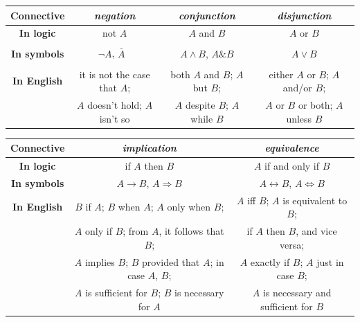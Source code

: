 \documentclass[12pt,notitlepage]{article}
\theoremstyle{plain}
\theoremstyle{definition}
\theoremstyle{plain}
\newcommand{\1}{\mathbf{1}}
\newcommand{\0}{\mathbf{0}}
\newcommand{\mcomm}[1]{}
\begin{document}
\begin{center}
\begin{tabular}{|c | c | c | c |}
\hline
{\bf Connective} & \it negation  & \it conjunction & \it disjunction \\
\hline
\bf In logic & not $A$  &$A$ and $B$&$A$ or $B$\\
\hline
\bf In symbols & $\neg A$, $\bar A\phantom{\dfrac{1}{2}}$  &$A \wedge B$, $A \mathop{\&} B$&$A \vee B$\\
\hline
\bf In English & it is not the case that $A$; &both $A$ and $B$; $A$ but $B$; & either $A$ or $B$; $A$ and/or $B$; \\
&   $A$ doesn't hold; $A$ isn't so &  $A$ despite $B$; $A$ while $B$ & $A$ or $B$ or both; $A$ unless $B$\\
\hline
\end{tabular}

\vspace{10mm}

\begin{tabular}{|c | c | c |}
\hline
\bf Connective & \it implication & \it equivalence \\
\hline
\bf In logic & if $A$ then $B$ &$A$ if and only if $B$\\
\hline
\bf In symbols & $A \to B$, $A \Rightarrow B$ &$A \leftrightarrow B$, $A \Leftrightarrow B$\\
\hline
\bf In English & $B$ if $A$; $B$ when $A$; $A$ only when $B$;   & $A$ iff $B$; $A$ is equivalent to $B$; \\
&$A$ only if $B$; from $A$, it follows that $B$; & if $A$ then $B$, and vice versa;  \\
&$A$ implies $B$; $B$ provided that $A$; in case $A$, $B$;  & $A$ exactly if $B$; $A$ just in case $B$; \\
& $A$ is sufficient for $B$; $B$ is necessary for $A$ & $A$ is necessary and sufficient for $B$ \\
\hline
\end{tabular}
\end{center}
\mcomm{It is rewarding to pay attention to the variety of natural language expressions for connectives. Students have often a hard time trying to comprehend clich\'es like \emph{only if}, \emph{{is necessary for}}, etc.}
\end{document}
